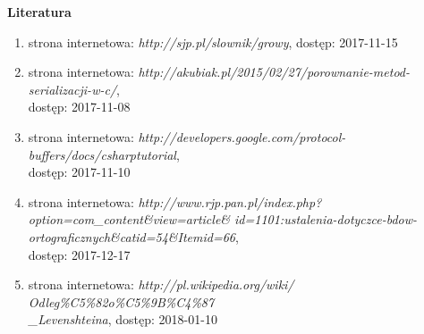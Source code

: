 \pagestyle {empty}

\vspace*{1.3cm}

{\Huge\textbf{Literatura}}

\vspace*{1cm}

\begin{enumerate}[\lbrack 1\rbrack]
	\item strona internetowa: \textit{http://sjp.pl/slownik/growy}, dostęp: 2017-11-15 \label{bib:slownik}
	\item strona internetowa: \textit{http://akubiak.pl/2015/02/27/porownanie-metod-serializacji-w-c/}, \\
	dostęp: 2017-11-08 \label{bib:serializ}
	\item strona internetowa: \textit{http://developers.google.com/protocol-buffers/docs/csharptutorial}, \\
	dostęp: 2017-11-10 \label{bib:protbuf}
	\item strona internetowa: \textit{http://www.rjp.pan.pl/index.php?option=com\_content\&view=article\&
		id=1101:ustalenia-dotyczce-bdow-ortograficznych\&catid=54\&Itemid=66}, \\
	dostęp: 2017-12-17 \label{bib:ort}
	\item strona internetowa: \textit{http://pl.wikipedia.org/wiki/		Odleg\%C5\%82o\%C5\%9B\%C4\%87\\\_Levenshteina}, dostęp: 2018-01-10 \label{bib:Lev}
\end{enumerate}

